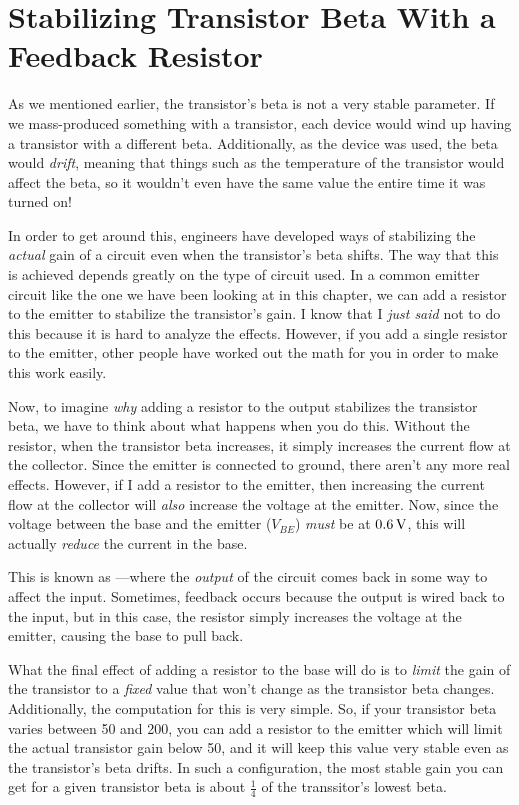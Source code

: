 \section{Stabilizing Transistor Beta With a Feedback Resistor}

As we mentioned earlier, the transistor's beta is not a very stable parameter.
If we mass-produced something with a transistor, each device would wind up having a transistor with a different beta.
Additionally, as the device was used, the beta would \emph{drift}, meaning that things such as the temperature of the transistor would affect the beta, so it wouldn't even have the same value the entire time it was turned on!

In order to get around this, engineers have developed ways of stabilizing the \emph{actual} gain of a circuit even when the transistor's beta shifts.
The way that this is achieved depends greatly on the type of circuit used.
In a common emitter circuit like the one we have been looking at in this chapter, we can add a resistor to the emitter to stabilize the transistor's gain.
I know that I \emph{just said} not to do this because it is hard to analyze the effects.
However, if you add a single resistor to the emitter, other people have worked out the math for you in order to make this work easily.

Now, to imagine \emph{why} adding a resistor to the output stabilizes the transistor beta, we have to think about what happens when you do this.
Without the resistor, when the transistor beta increases, it simply increases the current flow at the collector.  
Since the emitter is connected to ground, there aren't any more real effects.
However, if I add a resistor to the emitter, then increasing the current flow at the collector will \emph{also} increase the voltage at the emitter.
Now, since the voltage between the base and the emitter ($V_{BE}$) \emph{must} be at $0.6\,\si{\volt}$, this will actually \emph{reduce} the current in the base.

This is known as ---where the \emph{output} of the circuit comes back in some way to affect the input.
Sometimes, feedback occurs because the output is wired back to the input, but in this case, the resistor simply increases the voltage at the emitter, causing the base to pull back.

What the final effect of adding a resistor to the base will do is to \emph{limit} the gain of the transistor to a \emph{fixed} value that won't change as the transistor beta changes.
Additionally, the computation for this is very simple.
So, if your transistor beta varies between 50 and 200, you can add a resistor to the emitter which will limit the actual transistor gain below 50, and it will keep this value very stable even as the transistor's beta drifts.
In such a configuration, the most stable gain you can get for a given transistor beta is about $\frac{1}{4}$ of the transsitor's lowest beta.

